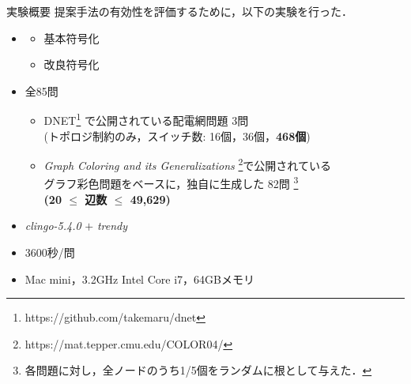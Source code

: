 \begin{frame}{実験概要}
  \renewcommand{\thefootnote}{\fnsymbol{footnote}}
  \setcounter{footnote}{1}
  提案手法の有効性を評価するために，以下の実験を行った．
  \begin{itemize}
  \item {}
    \begin{itemize}
    \item 基本符号化
    \item 改良符号化
    \end{itemize}
  \item {} 全85問
    \begin{itemize}
    \item DNET\footnote{https://github.com/takemaru/dnet}%
      で公開されている配電網問題 3問 \\ (トポロジ制約のみ，スイッチ数:
      16個，36個，\alert{\bf 468個})
    \item \textit{Graph Coloring and its Generalizations}
      \footnote{https://mat.tepper.cmu.edu/COLOR04/}で公開されている \\
      グラフ彩色問題をベースに，独自に生成した 82問 
      \footnote{各問題に対し，全ノードのうち1/5個をランダムに根として与えた．}\\
      \alert{\bf (20 $\leq$ 辺数 $\leq$ 49,629)}
    \end{itemize}
  \item {} \textit{clingo-5.4.0} $+$ \textit{trendy}
  \item {} 3600秒/問
  \item {} Mac mini，3.2GHz Intel Core i7，64GBメモリ
  \end{itemize}
\end{frame}
